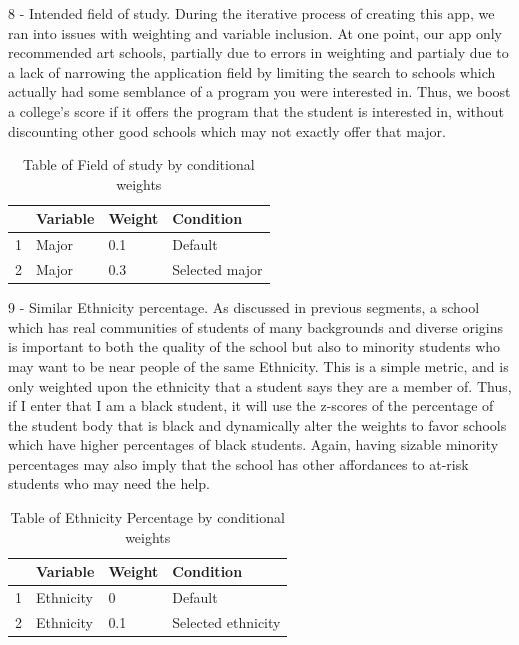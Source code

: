 \documentclass{article}\usepackage[]{graphicx}\usepackage[]{color}
\begin{document}
8 - Intended field of study. During the iterative process of creating this app, we ran into issues with weighting and variable inclusion. At one point, our app only recommended art schools, partially due to errors in weighting and partialy due to a lack of narrowing the application field by limiting the search to schools which actually had some semblance of a program you were interested in. Thus, we boost a college's score if it offers the program that the student is interested in, without discounting other good schools which may not exactly offer that major.

\begin{table}[ht]
\centering
\begin{tabular}{rlll}
  \hline
 & Variable & Weight & Condition \\ 
  \hline
1 & Major & 0.1 & Default \\ 
  2 & Major & 0.3 & Selected major \\ 
   \hline
\end{tabular}
\caption{Table of Field of study by conditional weights} 
\end{table}


9 - Similar Ethnicity percentage. As discussed in previous segments, a school which has real communities of students of many backgrounds and diverse origins is important to both the quality of the school but also to minority students who may want to be near people of the same Ethnicity. This is a simple metric, and is only weighted upon the ethnicity that a student says they are a member of. Thus, if I enter that I am a black student, it will use the z-scores of the percentage of the student body that is black and dynamically alter the weights to favor schools which have higher percentages of black students. Again, having sizable minority percentages may also imply that the school has other affordances to at-risk students who may need the help.

\begin{table}[ht]
\centering
\begin{tabular}{rlll}
  \hline
 & Variable & Weight & Condition \\ 
  \hline
1 & Ethnicity & 0 & Default \\ 
  2 & Ethnicity & 0.1 & Selected ethnicity \\ 
   \hline
\end{tabular}
\caption{Table of Ethnicity Percentage by conditional weights} 
\end{table}
\end{document}
